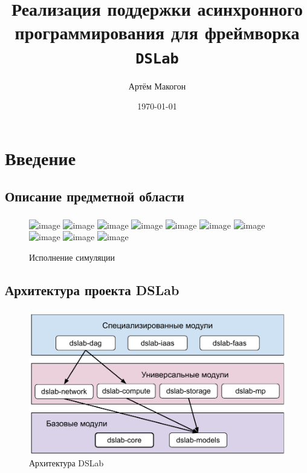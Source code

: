 \documentclass[t]{beamer}  %
\title{Реализация поддержки асинхронного программирования для фреймворка \texttt{DSLab}}
\author{Артём Макогон}
\date{\today}
\begin{document}
	
	\begin{frame}
		\maketitle
	\end{frame}
	

    \section{Введение}
    \subsection{Описание предметной области}


    \begin{frame}
    \frametitle{\insertsection} 
	\framesubtitle{\insertsubsection}

	\begin{figure}
		\centering
		\includegraphics<1>[width=\linewidth]{images/event_pipeline_0}
		\includegraphics<2>[width=\linewidth]{images/event_pipeline_1}
		\includegraphics<3>[width=\linewidth]{images/event_pipeline_2}
		\includegraphics<4>[width=\linewidth]{images/event_pipeline_3}
		\includegraphics<5>[width=\linewidth]{images/event_pipeline_4}
		\includegraphics<6>[width=\linewidth]{images/event_pipeline_5}
		\includegraphics<7>[width=\linewidth]{images/event_pipeline_6}
		\includegraphics<8>[width=\linewidth]{images/event_pipeline_7}
		\includegraphics<9>[width=\linewidth]{images/event_pipeline_8}
		\includegraphics<10>[width=\linewidth]{images/event_pipeline_9}
		\label{simulation}
		\caption*{Исполнение симуляции}
	\end{figure}
        
    \end{frame}

	\subsection{Архитектура проекта DSLab}
	\begin{frame}
		\frametitle{\insertsection} 
		\framesubtitle{\insertsubsection}

		\begin{figure}[H]
			\centering
			\includegraphics[width=0.9\linewidth]{images/dslab_arc}
			\caption*{Архитектура DSLab}
			\label{dslab_arc}
		\end{figure}
	\end{frame}
\end{document}
